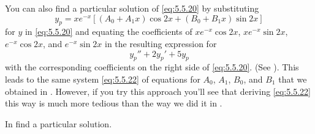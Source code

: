 You can also find a particular solution of \eqref{eq:5.5.20}
by substituting
\[
y_p=xe^{-x}\left[(A_0+A_1x)\cos 2x +(B_0+B_1x)\sin 2x\right]
\]
for $y$  in \eqref{eq:5.5.20}
and equating the  coefficients of $xe^{-x}\cos2x$,
$xe^{-x}\sin2x$, $e^{-x}\cos2x$, and $e^{-x}\sin2x$  in the
resulting expression for
\[
y_p''+2y_p'+5y_p
\]
with the corresponding coefficients on the right side of
\eqref{eq:5.5.20}. (See ). This leads to the
same system \eqref{eq:5.5.22} of equations for $A_0$, $A_1$, $B_0$, and
$B_1$ that we obtained in . However, if you try
this approach you'll see that deriving \eqref{eq:5.5.22} this way is
much more tedious than the way we did it in .

\exercises
In  find a particular solution.


